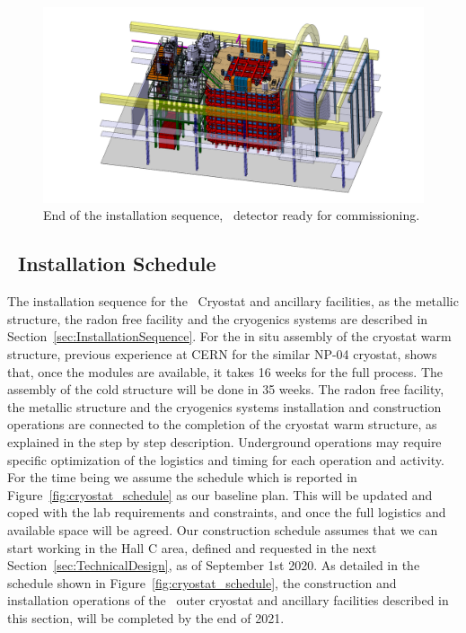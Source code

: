 \begin{figure}[!h]
\includegraphics[width=1.0\textwidth]{./Figures/assembly_sequence_11_07/58.png}
\caption{End of the installation sequence, \DSks\ detector ready for commissioning.}
\label{fig:Ds20kInstallSequence5}
\end{figure}

\vspace{2cm}
\newpage
\vspace{2cm}

\subsection{\DSks\ Installation Schedule}
\label{sec:InstallationSchedule}

The installation sequence for the \DSks\ Cryostat and ancillary facilities, as the metallic structure, the radon free facility and the cryogenics systems are described in Section~\ref{sec:InstallationSequence}. For the in situ assembly of the cryostat warm structure, previous experience at CERN for the similar NP-04 cryostat, shows that, once the modules are available, it takes 16 weeks for the full process. The assembly of the cold structure will be done in 35 weeks. The radon free facility, the metallic structure and the cryogenics systems installation and construction operations are connected to the completion of the cryostat warm structure, as explained in the step by step description. Underground operations may require specific optimization of the logistics and timing for each operation and activity. For the time being we assume the schedule which is reported in Figure~\ref{fig:cryostat_schedule} as our baseline plan. This will be updated and coped with the lab requirements and constraints, and once the full logistics and available space will be agreed. Our construction schedule assumes that we can start working in the Hall C area, defined and requested in the next Section~\ref{sec:TechnicalDesign}, as of September 1st 2020. As detailed in the schedule shown in Figure~\ref{fig:cryostat_schedule}, the construction and installation operations of the \DSks\ outer cryostat and ancillary facilities described in this section, will be completed by the end of 2021.

